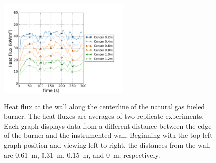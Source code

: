 \documentclass[twoside]{uocthesis}
\begin{document}
{\begin{figure}[ht!]
	\includegraphics[width=2.5in]{../Figures/TWNG07_HF_Center_Avg}\\
	\caption[Heat flux at the wall along the centerline of the natural gas fueled burner]{Heat flux at the wall along the centerline of the natural gas fueled burner. The heat fluxes are averages of two replicate experiments. Each graph displays data from a different distance between the edge of the burner and the instrumented wall. Beginning with the top left graph position and viewing left to right, the distances from the wall are 0.61~m, 0.31~m, 0.15~m, and 0~m, respectively.}
	\label{HF_Center_TWNG_comp}
\end{figure}

}
\end{document}
